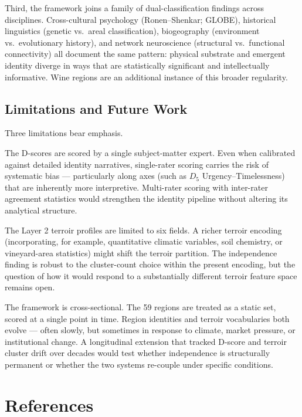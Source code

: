 \documentclass[11pt]{article}
\begin{document}
Third, the framework joins a family of dual-classification findings across disciplines. Cross-cultural psychology (Ronen--Shenkar; GLOBE), historical linguistics (genetic vs.\ areal classification), biogeography (environment vs.\ evolutionary history), and network neuroscience (structural vs.\ functional connectivity) all document the same pattern: physical substrate and emergent identity diverge in ways that are statistically significant and intellectually informative. Wine regions are an additional instance of this broader regularity.

\subsection{Limitations and Future Work}
Three limitations bear emphasis.

The D-scores are scored by a single subject-matter expert. Even when calibrated against detailed identity narratives, single-rater scoring carries the risk of systematic bias --- particularly along axes (such as $D_5$ Urgency--Timelessness) that are inherently more interpretive. Multi-rater scoring with inter-rater agreement statistics would strengthen the identity pipeline without altering its analytical structure.

The Layer 2 terroir profiles are limited to six fields. A richer terroir encoding (incorporating, for example, quantitative climatic variables, soil chemistry, or vineyard-area statistics) might shift the terroir partition. The independence finding is robust to the cluster-count choice within the present encoding, but the question of how it would respond to a substantially different terroir feature space remains open.

The framework is cross-sectional. The 59 regions are treated as a static set, scored at a single point in time. Region identities and terroir vocabularies both evolve --- often slowly, but sometimes in response to climate, market pressure, or institutional change. A longitudinal extension that tracked D-score and terroir cluster drift over decades would test whether independence is structurally permanent or whether the two systems re-couple under specific conditions.

\section*{References}
\end{document}

